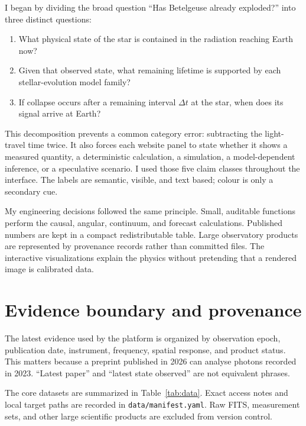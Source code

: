 \documentclass[11pt,a4paper]{article}
\begin{document}
I began by dividing the broad question ``Has Betelgeuse already exploded?'' into three distinct questions:

\begin{enumerate}
  \item What physical state of the star is contained in the radiation reaching Earth now?
  \item Given that observed state, what remaining lifetime is supported by each stellar-evolution model family?
  \item If collapse occurs after a remaining interval $\Delta t$ at the star, when does its signal arrive at Earth?
\end{enumerate}

This decomposition prevents a common category error: subtracting the light-travel time twice. It also forces each website panel to state whether it shows a measured quantity, a deterministic calculation, a simulation, a model-dependent inference, or a speculative scenario. I used those five claim classes throughout the interface. The labels are semantic, visible, and text based; colour is only a secondary cue.

My engineering decisions followed the same principle. Small, auditable functions perform the causal, angular, continuum, and forecast calculations. Published numbers are kept in a compact redistributable table. Large observatory products are represented by provenance records rather than committed files. The interactive visualizations explain the physics without pretending that a rendered image is calibrated data.

\section{Evidence boundary and provenance}

The latest evidence used by the platform is organized by observation epoch, publication date, instrument, frequency, spatial response, and product status. This matters because a preprint published in 2026 can analyse photons recorded in 2023. ``Latest paper'' and ``latest state observed'' are not equivalent phrases.

The core datasets are summarized in Table~\ref{tab:data}. Exact access notes and local target paths are recorded in \texttt{data/manifest.yaml}. Raw FITS, measurement sets, and other large scientific products are excluded from version control.
\end{document}
